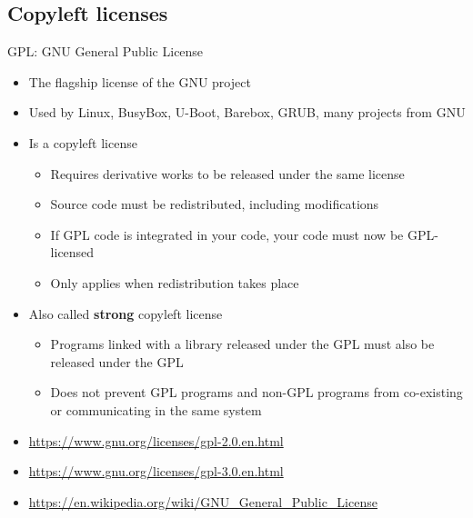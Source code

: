 \subsection{Copyleft licenses}

\begin{frame}{GPL: GNU General Public License}
  \begin{itemize}
  \item The flagship license of the GNU project
  \item Used by Linux, BusyBox, U-Boot, Barebox, GRUB, many projects from GNU
  \item Is a copyleft license
    \begin{itemize}
    \item Requires derivative works to be released under the same
      license
    \item Source code must be redistributed, including modifications
    \item If GPL code is integrated in your code, your code must now
      be GPL-licensed
    \item Only applies when redistribution takes place
    \end{itemize}
  \item Also called {\bf strong} copyleft license
    \begin{itemize}
    \item Programs linked with a library released under the GPL must
      also be released under the GPL
    \item Does not prevent GPL programs and non-GPL programs from
      co-existing or communicating in the same system
    \end{itemize}
  \item \url{https://www.gnu.org/licenses/gpl-2.0.en.html}
  \item \url{https://www.gnu.org/licenses/gpl-3.0.en.html}
  \item \url{https://en.wikipedia.org/wiki/GNU_General_Public_License}
  \end{itemize}
\end{frame}

